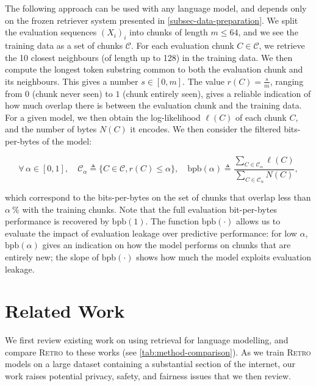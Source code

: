 The following approach can be used with any language model, and depends only on the frozen retriever system presented in \autoref{subsec-data-preparation}. We split the evaluation sequences ${(X_i)}_i$ into chunks of length $m \le 64$, and we see the training data as a set of chunks $\mathcal{C}$.
For each evaluation chunk $C \in \mathcal{C}$, we retrieve the 10 closest neighbours (of length up to 128) in the training data. We then compute the longest token substring common to both the evaluation chunk and its neighbours. This gives a number $s \in [0, m]$. The value $r(C) = \frac{s}{m}$, ranging from $0$ (chunk never seen) to $1$ (chunk entirely seen), gives a reliable indication of how much overlap there is between the evaluation chunk and the training data. For a given model, we then obtain the log-likelihood $\ell(C)$ of each chunk $C$, and the number of bytes $N(C)$ it encodes. We then consider the filtered bits-per-bytes of the model:

\begin{equation}
    \forall\,\alpha \in [0,1],\quad \mathcal{C}_\alpha \triangleq \{ C \in \mathcal{C}, r(C) \leqslant \alpha \},\quad\textrm{bpb}(\alpha) \triangleq
    \frac{\sum_{C \in \mathcal{C}_\alpha} \ell(C)}{
    \sum_{C \in \mathcal{C}_\alpha} N(C)
    },
\end{equation}

which correspond to the bits-per-bytes on the set of chunks that overlap less than $\alpha\:\%$ with the training chunks. Note that the full evaluation bit-per-bytes performance is recovered by $\mathrm{bpb}(1)$. The function $\textrm{bpb}(\cdot)$ allows us to evaluate the impact of evaluation leakage over predictive performance: for low $\alpha$, $\textrm{bpb}(\alpha)$ gives an indication on how the model performs on chunks that are entirely new; the slope of $\textrm{bpb}(\cdot)$ shows how much the model exploits evaluation leakage.

\section{Related Work}
\label{sec-related}

We first review existing work on using retrieval for language modelling, and compare \textsc{Retro} to these works (see \autoref{tab:method-comparison}).
As we train \textsc{Retro} models on a large dataset containing a substantial section of the internet, our work raises potential privacy, safety, and fairness issues that we then review. 


